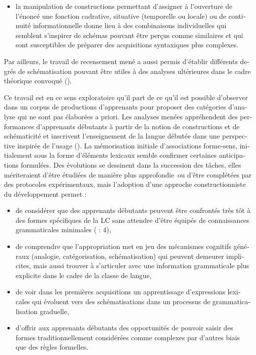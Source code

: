 \documentclass[output=paper]{langscibook}
\begin{document}
\begin{otherlanguage}{french}
\begin{itemize}
\item la manipulation de constructions permettant d’assigner à l’ouverture de l’énoncé une fonction cadrative, situative (temporelle ou locale) ou de continuité informationnelle donne lieu à des combinaisons individuelles qui semblent s’inspirer de schémas pouvant être perçus comme similaires et qui sont susceptibles de préparer des acquisitions syntaxiques plus complexes.
\end{itemize}

Par ailleurs, le travail de recensement mené a aussi permis d’établir différents degrés de schématisation pouvant être utiles à des analyses ultérieures dans le cadre théorique convoqué ().

Ce travail est en ce sens exploratoire qu’il part de ce qu’il est possible d’observer dans un corpus de productions d’apprenants pour proposer des catégories d’analyse qui ne sont pas élaborées a priori. Les analyses menées appréhendent des performances d’apprenants débutants à partir de la notion de constructions et de schématicité \citep{Legallois2021} et inscrivent l’enseignement de la langue débutée dans une perspective inspirée de l’usage (\citealt{TylerOrtega2018}). La mémorisation initiale d’associations forme-sens, initialement sous la forme d’éléments lexicaux semble confirmer certaines anticipations formulées. Des évolutions se dessinent dans la succession des tâches, elles mériteraient d’être étudiées de manière plus approfondie~ou d’être complétées par des protocoles expérimentaux, mais l’adoption d’une approche constructionniste du développement permet :

\begin{itemize}\sloppy
  \item de considérer que des apprenants débutants peuvent être confrontés très tôt à des formes spécifiques de la LC sans attendre d’être équipés de connaissances grammaticales minimales (\citealt{Ellis2020} : 4),
  \item de comprendre que l’appropriation met en jeu des mécanismes cognitifs généraux (analogie, catégorisation, schématisation) qui peuvent demeurer implicites, mais aussi trouver à s’articuler avec une information grammaticale plus explicite dans le cadre de la classe de langue,
  \item de voir dans les premières acquisitions un apprentissage d’expressions lexicales qui évoluent vers des schématisations dans un processus de grammaticalisation graduelle, 
  \item d’offrir aux apprenants débutants des opportunités de pouvoir saisir des formes traditionnellement considérées comme complexes par d’autres biais que des règles formelles. 
\end{itemize}


\end{otherlanguage}
\end{document}
